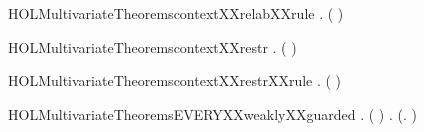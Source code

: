 \newcommand{\HOLMultivariateTheoremscontextXXrelab}{\UseVerbatim{HOLMultivariateTheoremscontextXXrelab}}
\begin{SaveVerbatim}{HOLMultivariateTheoremscontextXXrelabXXrule}
\HOLTokenTurnstile{} \HOLSymConst{\HOLTokenForall{}}  .    \HOLSymConst{\HOLTokenImp{}}   (  )
\end{SaveVerbatim}
\newcommand{\HOLMultivariateTheoremscontextXXrelabXXrule}{\UseVerbatim{HOLMultivariateTheoremscontextXXrelabXXrule}}
\begin{SaveVerbatim}{HOLMultivariateTheoremscontextXXrestr}
\HOLTokenTurnstile{} \HOLSymConst{\HOLTokenForall{}}  .   (\HOLConst{\ensuremath{\nu}}  ) \HOLSymConst{\HOLTokenImp{}}   
\end{SaveVerbatim}
\newcommand{\HOLMultivariateTheoremscontextXXrestr}{\UseVerbatim{HOLMultivariateTheoremscontextXXrestr}}
\begin{SaveVerbatim}{HOLMultivariateTheoremscontextXXrestrXXrule}
\HOLTokenTurnstile{} \HOLSymConst{\HOLTokenForall{}}  .    \HOLSymConst{\HOLTokenImp{}}   (\HOLConst{\ensuremath{\nu}}  )
\end{SaveVerbatim}
\newcommand{\HOLMultivariateTheoremscontextXXrestrXXrule}{\UseVerbatim{HOLMultivariateTheoremscontextXXrestrXXrule}}
\begin{SaveVerbatim}{HOLMultivariateTheoremsEVERYXXweaklyXXguarded}
\HOLTokenTurnstile{} \HOLSymConst{\HOLTokenForall{}} .
        ( )  \HOLSymConst{\HOLTokenImp{}}
       \HOLSymConst{\HOLTokenForall{}} .    \HOLSymConst{\HOLTokenConj{}}    \HOLSymConst{\HOLTokenImp{}}  (\HOLTokenLambda{}.    )
\end{SaveVerbatim}
\newcommand{\HOLMultivariateTheoremsEVERYXXweaklyXXguarded}{\UseVerbatim{HOLMultivariateTheoremsEVERYXXweaklyXXguarded}}
